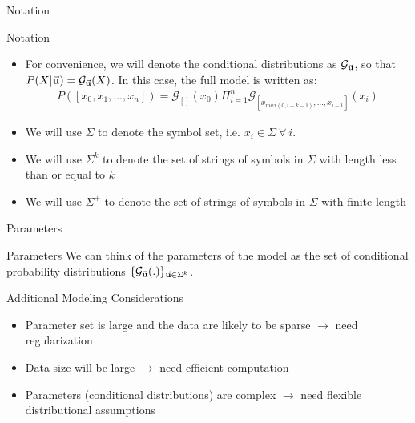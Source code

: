 \documentclass{beamer}
\newcommand{\G}{\mathcal{G}}
\newcommand{\bu}{{\bf u}}
\begin{document}
\begin{frame}[t]{Notation}
	\begin{block}{Notation}
		\begin{itemize}
			\item {For convenience, we will denote the conditional distributions as $\G_{\vec \bu}$, so that $P(X | \vec \bu) =  \G_{\vec \bu}(X)$.  In this case, the full model is written as:
						\begin{eqnarray*}
							P([x_0, x_1, \ldots, x_n]) = \G_{[]}(x_0) \Pi_{i = 1}^n \G_{[x_{max(0, i-k-1)}, \ldots, x_{i-1}]}(x_i)  
						\end{eqnarray*}
			}
		 	\item We will use $\Sigma$ to denote the symbol set, i.e. $x_i \in \Sigma \ \forall \ i$.
			\item We will use $\Sigma^k$ to denote the set of strings of symbols in $\Sigma$ with length less than or equal to $k$
			\item We will use $\Sigma^+$ to denote the set of strings of symbols in $\Sigma$ with finite length
		\end{itemize}
	\end{block}
	
\end{frame}

\begin{frame}[t]{Parameters}
	\begin{block}{Parameters}
		We can think of the parameters of the model as the set of conditional probability distributions $\{\G_{\vec \bu} (.)\}_{\vec \bu \in \Sigma^k}$. 
	\end{block}
	
	\begin{block}{Additional Modeling Considerations}
		\begin{itemize}
			\item Parameter set is large and the data are likely to be sparse $\rightarrow$ need regularization
			\item Data size will be large $\rightarrow$ need efficient computation
			\item Parameters (conditional distributions) are complex $\rightarrow$ need flexible distributional assumptions
		\end{itemize}
	\end{block}
\end{frame}
\end{document}

